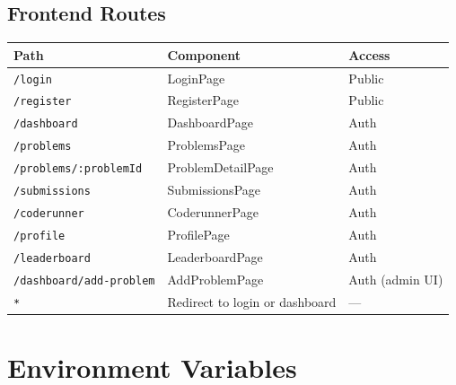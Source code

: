 \documentclass[11pt,a4paper]{article}
\begin{document}
\subsection{Frontend Routes}
\begin{table}[h]
\centering
\small
\begin{tabular}{@{}lll@{}}
\toprule
\textbf{Path} & \textbf{Component} & \textbf{Access} \\
\midrule
\texttt{/login} & LoginPage & Public \\
\texttt{/register} & RegisterPage & Public \\
\texttt{/dashboard} & DashboardPage & Auth \\
\texttt{/problems} & ProblemsPage & Auth \\
\texttt{/problems/:problemId} & ProblemDetailPage & Auth \\
\texttt{/submissions} & SubmissionsPage & Auth \\
\texttt{/coderunner} & CoderunnerPage & Auth \\
\texttt{/profile} & ProfilePage & Auth \\
\texttt{/leaderboard} & LeaderboardPage & Auth \\
\texttt{/dashboard/add-problem} & AddProblemPage & Auth (admin UI) \\
\texttt{*} & Redirect to login or dashboard & --- \\
\bottomrule
\end{tabular}
\end{table}

\section{Environment Variables}
\end{document}
